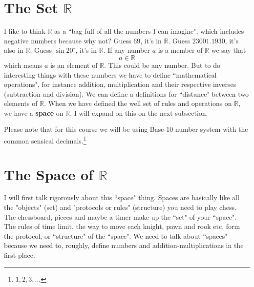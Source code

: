 \documentclass[letter]{article}
\title{}
\author{Ahmed Saad Sabit, Rice University}
\date{\today}
\begin{document}
\maketitle

\section*{The Set $\mathbb{R}$ } 
\textsf{I like to think $\mathbb{R}$ as a ``bag full of all the numbers I can imagine", which includes negative numbers because why not? 
\newline
Guess 69, it's in $\mathbb{R}$. Guess $23001.1930$, it's also in $\mathbb{R}$. Guess $\sin 20^{\circ}$, it's in $\mathbb{R}$. If any number $a$ is a member of $\mathbb{R}$ we say that 
\[
a \in \mathbb{R}
\] 
which means $a$ is an element of $\mathbb{R}$. This could be any number. But to do interesting things with these numbers we have to define ``mathematical operations", for instance addition, multiplication and their respective inverses (subtraction and division). We can define a definitions for ``distance" between two elements of $\mathbb{R}$. When we have defined the well set of rules and operations on $\mathbb{R}$, we have a \textbf{space} on $\mathbb{R}$. I will expand on this on the next subsection.   
}


Please note that for this course we will be using Base-10 number system with the common sensical decimals.\footnote{$1,2,3,\ldots$}











\section*{The Space of $\mathbb{R}$ }

\textsf{I will first talk rigorously about this ``space" thing. Spaces are basically like all the "objects" (set) and "protocols or rules" (structure) you need to play chess. The chessboard, pieces and maybe a timer make up the ``set" of your ``space". The rules of time limit, the way to move each knight, pawn and rook etc. form the protocol, or ``structure" of the ``space". We need to talk about ``spaces" because we need to, roughly, define numbers and addition-multiplications in the first place.  }
\end{document}
